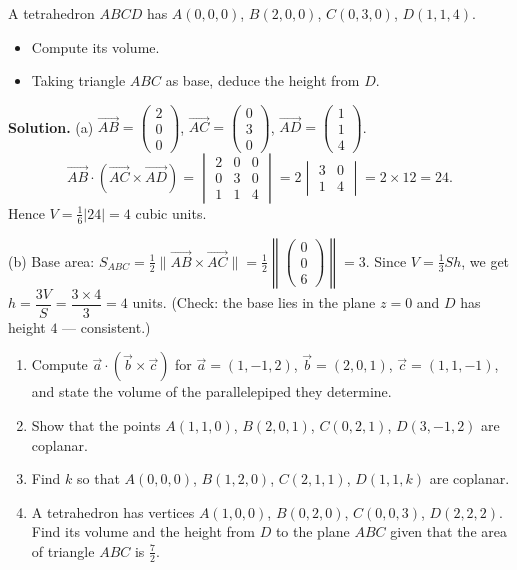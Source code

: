 \documentclass[11pt]{article}
\begin{document}
\begin{exoresolu}
A tetrahedron $ABCD$ has $A(0,0,0)$, $B(2,0,0)$, $C(0,3,0)$, $D(1,1,4)$.
\begin{itemize}
\item[(a)] Compute its volume.
\item[(b)] Taking triangle $ABC$ as base, deduce the height from $D$.
\end{itemize}
\tcblower
\textbf{Solution.}
(a) $\overrightarrow{AB} = \begin{pmatrix} 2 \\ 0 \\ 0 \end{pmatrix}$, $\overrightarrow{AC} = \begin{pmatrix} 0 \\ 3 \\ 0 \end{pmatrix}$, $\overrightarrow{AD} = \begin{pmatrix} 1 \\ 1 \\ 4 \end{pmatrix}$.
\[
\overrightarrow{AB} \cdot \left( \overrightarrow{AC} \times \overrightarrow{AD} \right)
= \begin{vmatrix} 2 & 0 & 0 \\ 0 & 3 & 0 \\ 1 & 1 & 4 \end{vmatrix}
= 2 \begin{vmatrix} 3 & 0 \\ 1 & 4 \end{vmatrix} = 2 \times 12 = 24.
\]
Hence $V = \tfrac16 |24| = 4$ cubic units.

(b) Base area: $S_{ABC} = \tfrac12 \|\overrightarrow{AB} \times \overrightarrow{AC}\| = \tfrac12 \left\| \begin{pmatrix} 0 \\ 0 \\ 6 \end{pmatrix} \right\| = 3$.
Since $V = \tfrac13 S h$, we get $h = \dfrac{3V}{S} = \dfrac{3 \times 4}{3} = 4$ units. (Check: the base lies in the plane $z=0$ and $D$ has height $4$ --- consistent.)
\end{exoresolu}

\begin{exercice}[Practice]
\begin{enumerate}
\item Compute $\vec{a} \cdot (\vec{b} \times \vec{c})$ for $\vec{a} = (1, -1, 2)$, $\vec{b} = (2, 0, 1)$, $\vec{c} = (1, 1, -1)$, and state the volume of the parallelepiped they determine.
\item Show that the points $A(1,1,0)$, $B(2,0,1)$, $C(0,2,1)$, $D(3,-1,2)$ are coplanar.
\item Find $k$ so that $A(0,0,0)$, $B(1,2,0)$, $C(2,1,1)$, $D(1,1,k)$ are coplanar.
\item A tetrahedron has vertices $A(1,0,0)$, $B(0,2,0)$, $C(0,0,3)$, $D(2,2,2)$. Find its volume and the height from $D$ to the plane $ABC$ given that the area of triangle $ABC$ is $\tfrac72$.
\end{enumerate}
\end{exercice}
\end{document}
